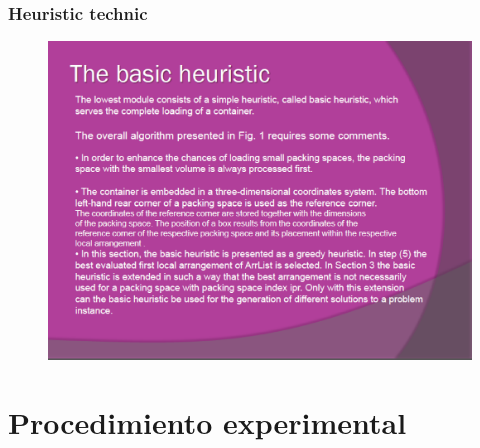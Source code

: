 \documentclass{beamer}
\begin{document}
\begin{frame}
\frametitle{Heuristic technic }
\begin{figure}[!th]
\begin{center}
\includegraphics[width=1\textwidth]{img/picn4.eps}
\end{center}
\end{figure}
\end{frame}

\section{Procedimiento experimental}
\end{document}

